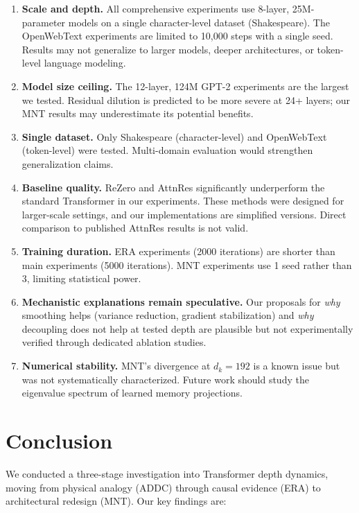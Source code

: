 \documentclass[10pt]{article}
\begin{document}
\begin{enumerate}[leftmargin=*,itemsep=2pt]
    \item \textbf{Scale and depth.} All comprehensive experiments use 8-layer, 25M-parameter models on a single character-level dataset (Shakespeare). The OpenWebText experiments are limited to 10,000 steps with a single seed. Results may not generalize to larger models, deeper architectures, or token-level language modeling.
    \item \textbf{Model size ceiling.} The 12-layer, 124M GPT-2 experiments are the largest we tested. Residual dilution is predicted to be more severe at 24+ layers; our MNT results may underestimate its potential benefits.
    \item \textbf{Single dataset.} Only Shakespeare (character-level) and OpenWebText (token-level) were tested. Multi-domain evaluation would strengthen generalization claims.
    \item \textbf{Baseline quality.} ReZero and AttnRes significantly underperform the standard Transformer in our experiments. These methods were designed for larger-scale settings, and our implementations are simplified versions. Direct comparison to published AttnRes results is not valid.
    \item \textbf{Training duration.} ERA experiments (2000 iterations) are shorter than main experiments (5000 iterations). MNT experiments use 1 seed rather than 3, limiting statistical power.
    \item \textbf{Mechanistic explanations remain speculative.} Our proposals for \emph{why} smoothing helps (variance reduction, gradient stabilization) and \emph{why} decoupling does not help at tested depth are plausible but not experimentally verified through dedicated ablation studies.
    \item \textbf{Numerical stability.} MNT's divergence at $d_k=192$ is a known issue but was not systematically characterized. Future work should study the eigenvalue spectrum of learned memory projections.
\end{enumerate}

\section{Conclusion}

We conducted a three-stage investigation into Transformer depth dynamics, moving from physical analogy (ADDC) through causal evidence (ERA) to architectural redesign (MNT). Our key findings are:
\end{document}
